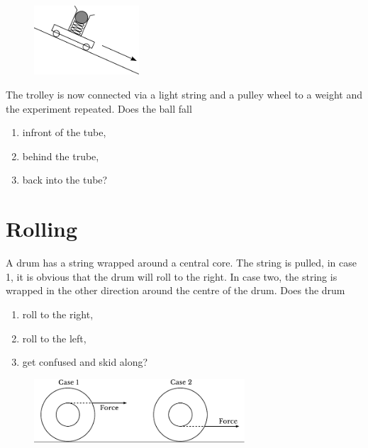 	\subsection{}
		\begin{figure}
		  \vspace{-20pt}
		  \begin{center}
		  	\includegraphics[width=0.35\textwidth]{trolley3.pdf}
		  \end{center}
		  \vspace{-20pt}
		\end{figure}
		The trolley is now connected via a light string and a pulley wheel to a weight and the experiment repeated. Does the ball fall
		\begin{enumerate}[label=\alph*)]
			\item infront of the tube,
			\item behind the trube,
			\item back into the tube?
		\end{enumerate}

\section{Rolling} %
	\label{sec:rolling}
	A drum has a string wrapped around a central core. The string is pulled, in case 1, it is obvious that the drum will roll to the right. In case two, the string is wrapped in the other direction around the centre of the drum. Does the drum
	\begin{enumerate}[label=\alph*)]
		\item roll to the right,
		\item roll to the left,
		\item get confused and skid along?
	\end{enumerate}
	\begin{figure}[ht]
	  \centering
	  \includegraphics[width=0.7\textwidth]{drums_rolling.pdf}
	\end{figure}

